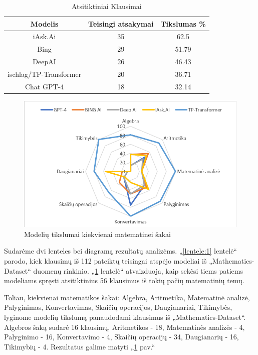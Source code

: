 \documentclass[conference]{IEEEtran}
\begin{document}
\begin{table}[h!]
        \centering
        \caption{Atsitiktiniai Klausimai}
        \label{lentele:2}
        \begin{tabular}{|c c c|} 
        \hline
        Modelis & Teisingi atsakymai & Tikslumas \% \\ [0.5ex] 
        \hline\hline
        iAsk.Ai & 35 & 62.5 \\
        \hline
        Bing & 29 & 51.79 \\
        \hline
        DeepAI & 26 & 46.43 \\
        \hline
        ischlag/TP-Transformer & 20 & 36.71 \\
        \hline
        Chat GPT-4 & 18 & 32.14 \\
        \hline
    \end{tabular}
    \end{table}
\begin{figure}[h!]
    \centering
    \includegraphics[scale=0.5]{lentele.png}
    \caption{Modelių tikslumai kiekvienai matematinei šakai}
    \label{pav:2}
\end{figure}
    
Sudarėme dvi lenteles bei diagramą rezultatų analizėms. „\ref{lentele:1} lentelė“ parodo, kiek klausimų iš 112 pateiktų
teisingai atspėjo modeliai iš „Mathematics-Dataset“ duomenų rinkinio. „\ref{lentele:2} lentelė“  atvaizduoja,
kaip sekėsi tiems patiems modeliams spręsti atsitiktinius 56 klausimus iš tokių pačių matematinių temų.



Toliau, kiekvienai matematikos šakai: Algebra, Aritmetika, Matematinė analizė, Palyginimas, Konvertavimas, Skaičių operacijos, Daugianariai, Tikimybės, lyginome modelių tikslumą panaudodami klausimus iš „Mathematics-Dataset“. Algebros šaką sudarė 16 klausimų, Aritmetikos - 18, Matematinės analizės - 4, Palyginimo - 16, Konvertavimo - 4, Skaičių operacijų - 34, Daugianarių - 16, Tikimybių - 4. Rezultatus galime matyti „\ref{pav:2} pav.“
\end{document}
